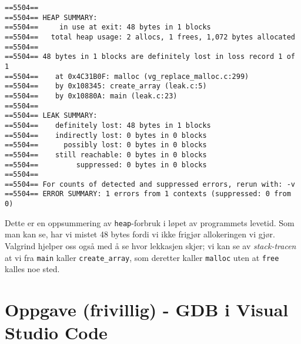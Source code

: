 \begin{lstlisting}[mathescape=true,keywordstyle=\color{black}]
==5504==
==5504== HEAP SUMMARY:
==5504==     in use at exit: 48 bytes in 1 blocks
==5504==   total heap usage: 2 allocs, 1 frees, 1,072 bytes allocated
==5504==
==5504== 48 bytes in 1 blocks are definitely lost in loss record 1 of 1
==5504==    at 0x4C31B0F: malloc (vg_replace_malloc.c:299)
==5504==    by 0x108345: create_array (leak.c:5)
==5504==    by 0x10880A: main (leak.c:23)
==5504==
==5504== LEAK SUMMARY:
==5504==    definitely lost: 48 bytes in 1 blocks
==5504==    indirectly lost: 0 bytes in 0 blocks
==5504==      possibly lost: 0 bytes in 0 blocks
==5504==    still reachable: 0 bytes in 0 blocks
==5504==         suppressed: 0 bytes in 0 blocks
==5504==
==5504== For counts of detected and suppressed errors, rerun with: -v
==5504== ERROR SUMMARY: 1 errors from 1 contexts (suppressed: 0 from 0)

\end{lstlisting}



Dette er en oppsummering av \verb|heap|-forbruk i løpet av programmets levetid. Som man kan se, har vi mistet 48 bytes fordi vi ikke frigjør allokeringen vi gjør. Valgrind hjelper oss også med å se hvor lekkasjen skjer; vi kan se av \textit{stack-tracen} at vi fra \verb|main| kaller \verb|create_array|, som deretter kaller \verb|malloc| uten at \verb|free| kalles noe sted.

\section{Oppgave (frivillig) - GDB i Visual Studio Code}

